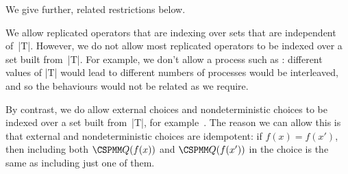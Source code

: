 We give further, related restrictions below.






 




We allow replicated operators that are indexing over sets that are independent
of~|T|.  However, we do not allow most replicated operators to be indexed over
a set built from~|T|.  For example, we don't allow a process such as :  different values of |T| would lead to different numbers
of processes would be interleaved, and so the behaviours would not be related
as we require.  

By contrast, we do allow external choices and nondeterministic
choices to be indexed over a set built from~|T|, for example~.  The reason we can allow this is that external and nondeterministic
choices are idempotent: if $f(x) = f(x')$, then including both $\M{Q}(f(x))$
and $\M{Q}(f(x'))$ in the choice is the same as including just one of them. 



